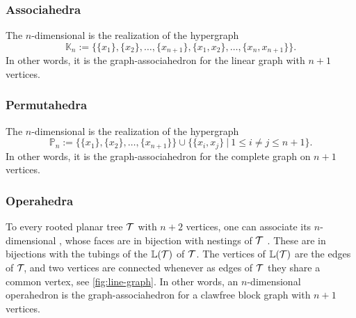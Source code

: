 \subsubsection{Associahedra}
The $n$-dimensional  is the realization of the hypergraph 
$$\mathbb{K}_n:=\{\{x_1\},\{x_2\},\ldots,\{x_{n+1}\},\{x_1,x_2\},\ldots,\{x_n,x_{n+1}\}\}.$$
In other words, it is the graph-associahedron for the linear graph with $n+1$ vertices.

\subsubsection{Permutahedra}
The $n$-dimensional  is the realization of the hypergraph 
$$\mathbb{P}_n:=\{\{x_1\},\{x_2\},\ldots,\{x_{n+1}\}\} \cup \{\{x_i,x_j\} \ | \ 1 \leq i \neq j \leq n+1 \}.$$
In other words, it is the graph-associahedron for the complete graph on $n+1$ vertices.

\subsubsection{Operahedra}
To every rooted planar tree $\mathcal{T}$ with $n+2$ vertices, one can associate its $n$-dimensional , whose faces are in bijection with nestings of $\mathcal{T}$ \cite{laplante-anfossiDiagonalOperahedra2022a,CLA1}.
These are in bijections with the tubings of the  $\mathbb{L}(\mathcal{T})$ of $\mathcal{T}$.
The vertices of $\mathbb{L}(\mathcal{T})$ are the edges of ${\cal T}\!$, and two vertices are connected whenever as edges of ${\cal T}$ they share a common vertex, see \cref{fig:line-graph}.
In other words, an $n$-dimensional operahedron is the graph-associahedron for a clawfree block graph with $n+1$ vertices.

